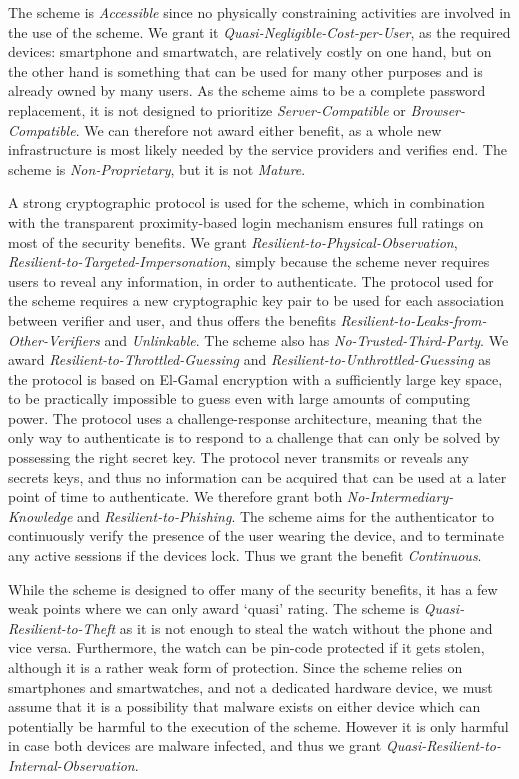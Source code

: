 The scheme is \textit{Accessible} since no physically constraining activities are involved in the use of the scheme. We grant it \textit{Quasi-Negligible-Cost-per-User}, as the required devices: smartphone and smartwatch, are relatively costly on one hand, but on the other hand is something that can be used for many other purposes and is already owned by many users.
As the scheme aims to be a complete password replacement, it is not designed to prioritize \textit{Server-Compatible} or \textit{Browser-Compatible}. We can therefore not award either benefit, as a whole new infrastructure is most likely needed by the service providers and verifies end. The scheme is \textit{Non-Proprietary}, but it is not \textit{Mature}.

A strong cryptographic protocol is used for the scheme, which in combination with the transparent proximity-based login mechanism ensures full ratings on most of the security benefits. We grant \textit{Resilient-to-Physical-Observation}, \textit{Resilient-to-Targeted-Impersonation}, simply because the scheme never requires users to reveal any information, in order to authenticate. The protocol used for the scheme requires a new cryptographic key pair to be used for each association between verifier and user, and thus offers the benefits \textit{Resilient-to-Leaks-from-Other-Verifiers} and \textit{Unlinkable}. The scheme also has \textit{No-Trusted-Third-Party}. We award \textit{Resilient-to-Throttled-Guessing} and \textit{Resi\-lient-to-Unthrottled-Guessing} as the protocol is based on El-Gamal encryption with a sufficiently large key space, to be practically impossible to guess even with large amounts of computing power. The protocol uses a challenge-response architecture, meaning that the only way to authenticate is to respond to a challenge that can only be solved by possessing the right secret key. The protocol never transmits or reveals any secrets keys, and thus no information can be acquired that can be used at a later point of time to authenticate. We therefore grant both \textit{No-Intermediary-Knowledge} and \textit{Resilient-to-Phishing}. The scheme aims for the \gls{authenticator} to continuously verify the presence of the user wearing the device, and to terminate any active sessions if the devices lock.  Thus we grant the benefit \textit{Continuous}.

While the scheme is designed to offer many of the security benefits, it has a few weak points where we can only award `quasi' rating. The scheme is \textit{Quasi-Resilient-to-Theft} as it is not enough to steal the watch without the phone and vice versa. Furthermore, the watch can be pin-code protected if it gets stolen, although it is a rather weak form of protection. Since the scheme relies on smartphones and smartwatches, and not a dedicated hardware device, we must assume that it is a possibility that malware exists on either device which can potentially be harmful to the execution of the scheme. However it is only harmful in case both devices are malware infected, and thus we grant \textit{Quasi-Resilient-to-Internal-Observation}.

